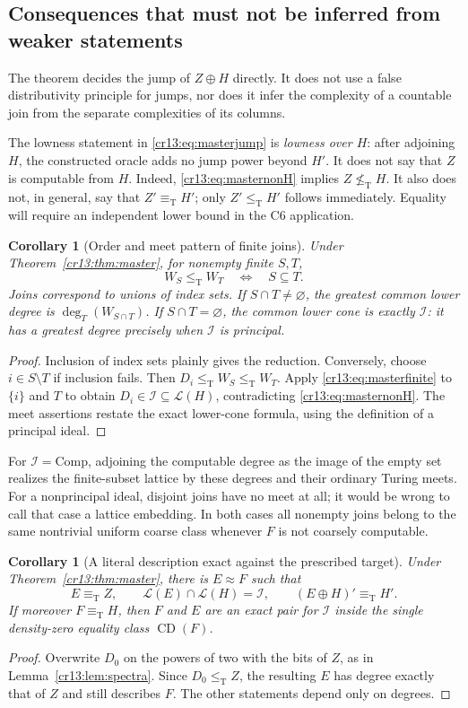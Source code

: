 \documentclass[11pt,letterpaper]{article}
\newtheorem{corollary}[theorem]{Corollary}
\theoremstyle{definition}
\theoremstyle{remark}\newtheorem{remark}[theorem]{Remark}
\numberwithin{equation}{section}
\newcommand{\leT}{\leq_{\mathrm T}}
\newcommand{\eqT}{\equiv_{\mathrm T}}
\newcommand{\nleT}{\nleq_{\mathrm T}}
\newcommand{\Low}{\mathcal L}
\newcommand{\CD}{\operatorname{CD}}
\newcommand{\Comp}{\mathrm{Comp}}
\newcommand{\Ideal}{\mathcal I}
\begin{document}
\subsection{Consequences that must not be inferred from weaker statements}
The theorem decides the jump of $Z\oplus H$ directly. It does not use a false distributivity principle for jumps, nor does it infer the complexity of a countable join from the separate complexities of its columns.

The lowness statement in \eqref{cr13:eq:masterjump} is \emph{lowness over $H$}: after adjoining $H$, the constructed oracle adds no jump power beyond $H'$. It does not say that $Z$ is computable from $H$. Indeed, \eqref{cr13:eq:masternonH} implies $Z\nleT H$. It also does not, in general, say that $Z'\eqT H'$; only $Z'\leT H'$ follows immediately. Equality will require an independent lower bound in the C6 application.

\begin{corollary}[Order and meet pattern of finite joins]\label{cr13:cor:finitepattern}
Under Theorem~\ref{cr13:thm:master}, for nonempty finite $S,T$,
\[
                         W_S\leT W_T\quad\Longleftrightarrow\quad S\subseteq T.
\]
Joins correspond to unions of index sets. If $S\cap T\ne\varnothing$, the greatest common lower degree is $\deg_T(W_{S\cap T})$. If $S\cap T=\varnothing$, the common lower cone is exactly $\Ideal$: it has a greatest degree precisely when $\Ideal$ is principal.
\end{corollary}
\begin{proof}
Inclusion of index sets plainly gives the reduction. Conversely, choose $i\in S\setminus T$ if inclusion fails. Then $D_i\leT W_S\leT W_T$. Apply \eqref{cr13:eq:masterfinite} to $\{i\}$ and $T$ to obtain $D_i\in\Ideal\subseteq\Low(H)$, contradicting \eqref{cr13:eq:masternonH}. The meet assertions restate the exact lower-cone formula, using the definition of a principal ideal.
\end{proof}
For $\Ideal=\Comp$, adjoining the computable degree as the image of the empty set realizes the finite-subset lattice by these degrees and their ordinary Turing meets. For a nonprincipal ideal, disjoint joins have no meet at all; it would be wrong to call that case a lattice embedding. In both cases all nonempty joins belong to the same nontrivial uniform coarse class whenever $F$ is not coarsely computable.

\begin{corollary}[A literal description exact against the prescribed target]\label{cr13:cor:literal}
Under Theorem~\ref{cr13:thm:master}, there is $E\approx F$ such that
\[
  E\eqT Z,\qquad \Low(E)\cap\Low(H)=\Ideal,
  \qquad (E\oplus H)'\eqT H'.
\]
If moreover $F\eqT H$, then $F$ and $E$ are an exact pair for $\Ideal$ inside the single density-zero equality class $\CD(F)$.
\end{corollary}
\begin{proof}
Overwrite $D_0$ on the powers of two with the bits of $Z$, as in Lemma~\ref{cr13:lem:spectra}. Since $D_0\leT Z$, the resulting $E$ has degree exactly that of $Z$ and still describes $F$. The other statements depend only on degrees.
\end{proof}
\end{document}
